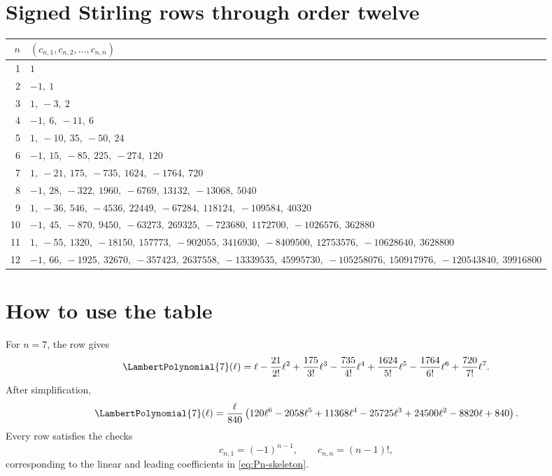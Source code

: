 \documentclass[11pt,openany]{book}
\theoremstyle{definition}
\theoremstyle{plain}
\theoremstyle{remark}
\begin{document}
\section{Signed Stirling rows through order twelve}
{\footnotesize
\begin{longtable}{@{}r>{\raggedright\arraybackslash}p{}@{}}
\toprule
\(n\) & \((c_{n,1},c_{n,2},\ldots,c_{n,n})\)\\
\midrule
\endhead
1 & \(1\)\\
2 & \(-1,\allowbreak\ 1\)\\
3 & \(1,\allowbreak\ -3,\allowbreak\ 2\)\\
4 & \(-1,\allowbreak\ 6,\allowbreak\ -11,\allowbreak\ 6\)\\
5 & \(1,\allowbreak\ -10,\allowbreak\ 35,\allowbreak\ -50,\allowbreak\ 24\)\\
6 & \(-1,\allowbreak\ 15,\allowbreak\ -85,\allowbreak\ 225,\allowbreak\ -274,\allowbreak\ 120\)\\
7 & \(1,\allowbreak\ -21,\allowbreak\ 175,\allowbreak\ -735,\allowbreak\ 1624,\allowbreak\ -1764,\allowbreak\ 720\)\\
8 & \(-1,\allowbreak\ 28,\allowbreak\ -322,\allowbreak\ 1960,\allowbreak\ -6769,\allowbreak\ 13132,\allowbreak\ -13068,\allowbreak\ 5040\)\\
9 & \(1,\allowbreak\ -36,\allowbreak\ 546,\allowbreak\ -4536,\allowbreak\ 22449,\allowbreak\ -67284,\allowbreak\ 118124,\allowbreak\ -109584,\allowbreak\ 40320\)\\
10 & \(-1,\allowbreak\ 45,\allowbreak\ -870,\allowbreak\ 9450,\allowbreak\ -63273,\allowbreak\ 269325,\allowbreak\ -723680,\allowbreak\ 1172700,\allowbreak\ -1026576,\allowbreak\ 362880\)\\
11 & \(1,\allowbreak\ -55,\allowbreak\ 1320,\allowbreak\ -18150,\allowbreak\ 157773,\allowbreak\ -902055,\allowbreak\ 3416930,\allowbreak\ -8409500,\allowbreak\ 12753576,\allowbreak\ -10628640,\allowbreak\ 3628800\)\\
12 & \(-1,\allowbreak\ 66,\allowbreak\ -1925,\allowbreak\ 32670,\allowbreak\ -357423,\allowbreak\ 2637558,\allowbreak\ -13339535,\allowbreak\ 45995730,\allowbreak\ -105258076,\allowbreak\ 150917976,\allowbreak\ -120543840,\allowbreak\ 39916800\)\\
\bottomrule
\end{longtable}
}
\section{How to use the table}
For \(n=7\), the row gives
\[
 \LambertPolynomial{7}(\ell)
 =\ell-\frac{21}{2!}\ell^2+\frac{175}{3!}\ell^3
 -\frac{735}{4!}\ell^4+\frac{1624}{5!}\ell^5
 -\frac{1764}{6!}\ell^6+\frac{720}{7!}\ell^7.
\]
After simplification,
\[
 \LambertPolynomial{7}(\ell)
 =\frac{\ell}{840}
 \left(120\ell^6-2058\ell^5+11368\ell^4-25725\ell^3
 +24500\ell^2-8820\ell+840\right).
\]
Every row satisfies the checks
\[
 c_{n,1}=(-1)^{n-1},
 \qquad
 c_{n,n}=(n-1)!,
\]
corresponding to the linear and leading coefficients in \cref{eq:Pn-skeleton}.
\end{document}
